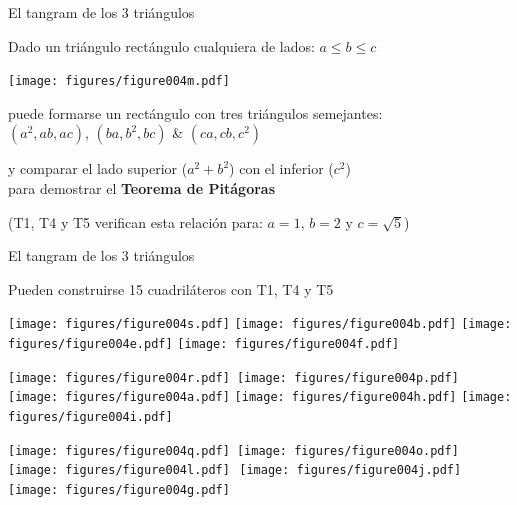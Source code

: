 \documentclass[14pt,aspectratio=169,usenames,dvipsnames]{beamer}
\begin{document}
    \begin{frame}{El tangram de los 3 triángulos}
        \begin{center}
            Dado un triángulo rectángulo cualquiera de lados: {\small $a \leq b \leq c$}

            \bigskip\bigskip

            \texttt{[image: figures/figure004m.pdf]}

            \bigskip

            {\small puede formarse un rectángulo con tres triángulos semejantes:\\{\footnotesize $(a^{2},ab,ac)$,\; $(ba,b^{2},bc)$\; \&\; $(ca,cb,c^{2})$}\\\bigskip

            y comparar el lado superior {\footnotesize($a^{2}\!+\!b^{2}$)} con el inferior {\footnotesize($c^{2}$)}\\para demostrar el \textbf{Teorema de Pitágoras}}

            \bigskip

            {\footnotesize (T1, T4 y T5 verifican esta relación para: $a=1$,\; $b=2$\; y\; $c=\sqrt{5}$)}
        \end{center}
    \end{frame}


    \begin{frame}{El tangram de los 3 triángulos}
        \begin{center}
            Pueden construirse 15 cuadriláteros con T1, T4 y T5

            \bigskip \bigskip

            \texttt{[image: figures/figure004s.pdf]}\quad
            \quad
            \texttt{[image: figures/figure004b.pdf]}\quad
            \texttt{[image: figures/figure004e.pdf]}\quad
            \texttt{[image: figures/figure004f.pdf]}\\

            \bigskip \bigskip

            \texttt{[image: figures/figure004r.pdf]}\quad\,
            \texttt{[image: figures/figure004p.pdf]}\quad
            \texttt{[image: figures/figure004a.pdf]}\quad
            \texttt{[image: figures/figure004h.pdf]}\quad
            \texttt{[image: figures/figure004i.pdf]}\!\\

            \bigskip \bigskip

            \texttt{[image: figures/figure004q.pdf]}\quad\;\,
            \texttt{[image: figures/figure004o.pdf]}\quad
            \texttt{[image: figures/figure004l.pdf]}\quad\,\,
            \texttt{[image: figures/figure004j.pdf]}\quad\;\,
            \texttt{[image: figures/figure004g.pdf]}\phantom{.}\\

            \bigskip \bigskip
        \end{center}
    \end{frame}
\end{document}
